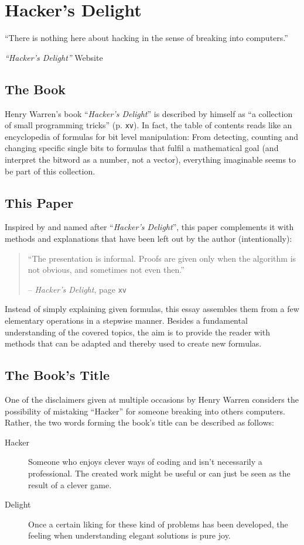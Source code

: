 \section{Hacker's Delight}\label{sec:book}
\epigraph{
``There is nothing here about hacking
in the sense of breaking into computers.''
}{
\emph{``Hacker's Delight''} Website
\cite{Warren:HD:Website}
}


\subsection*{The Book}
Henry Warren's book ``\emph{Hacker's Delight}''
is described by himself as
``a collection of small programming tricks''
\cite{Warren:2012:HD:2462741} (p. \texttt{xv}).
In fact, the table of contents reads like
an encyclopedia of formulas for bit level manipulation:
From detecting, counting and changing specific single bits
to formulas that fulfil a mathematical goal
(and interpret the bitword as a number, not a vector),
everything imaginable seems to be part of this collection.


\subsection*{This Paper}
Inspired by and named after ``\emph{Hacker's Delight}'',
this paper complements it with methods and explanations
that have been left out by the author (intentionally):

\begin{quote}
``The presentation is informal.
Proofs are given only when the algorithm is not obvious,
and sometimes not even then.''
\par\hfill -- \emph{Hacker's Delight},
page \texttt{xv} \cite{Warren:2012:HD:2462741}
\end{quote}

Instead of simply explaining given formulas,
this essay assembles them from a few elementary operations
in a stepwise manner.
Besides a fundamental understanding of the covered topics,
the aim is to provide the reader with methods
that can be adapted and thereby used to create new formulas.


\subsection*{The Book's Title}
One of the disclaimers given at multiple occasions by Henry Warren
considers the possibility of mistaking ``Hacker''
for someone breaking into others computers.
Rather, the two words forming the book's title
can be described as follows:
\begin{description}
\item[Hacker]
Someone who enjoys clever ways of coding
and isn't necessarily a professional.
The created work might be useful
or can just be seen as the result of a clever game.

\item[Delight]
Once a certain liking for these kind of problems has been developed,
the feeling when understanding elegant solutions is pure joy.
\end{description}
